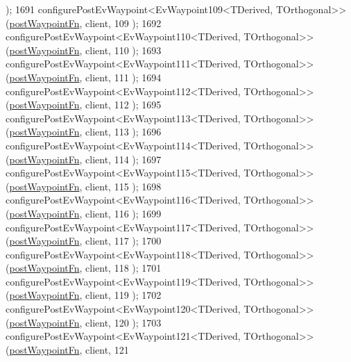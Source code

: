 \begin{DoxyCode}
      );
1691     configurePostEvWaypoint<EvWaypoint109<TDerived, TOrthogonal>>(\hyperlink{classcl__move__base__z_1_1WaypointEventDispatcher_a964a57fcce5d48ec60243230722d8dd7}{postWaypointFn}, client, 109
      );
1692     configurePostEvWaypoint<EvWaypoint110<TDerived, TOrthogonal>>(\hyperlink{classcl__move__base__z_1_1WaypointEventDispatcher_a964a57fcce5d48ec60243230722d8dd7}{postWaypointFn}, client, 110
      );
1693     configurePostEvWaypoint<EvWaypoint111<TDerived, TOrthogonal>>(\hyperlink{classcl__move__base__z_1_1WaypointEventDispatcher_a964a57fcce5d48ec60243230722d8dd7}{postWaypointFn}, client, 111
      );
1694     configurePostEvWaypoint<EvWaypoint112<TDerived, TOrthogonal>>(\hyperlink{classcl__move__base__z_1_1WaypointEventDispatcher_a964a57fcce5d48ec60243230722d8dd7}{postWaypointFn}, client, 112
      );
1695     configurePostEvWaypoint<EvWaypoint113<TDerived, TOrthogonal>>(\hyperlink{classcl__move__base__z_1_1WaypointEventDispatcher_a964a57fcce5d48ec60243230722d8dd7}{postWaypointFn}, client, 113
      );
1696     configurePostEvWaypoint<EvWaypoint114<TDerived, TOrthogonal>>(\hyperlink{classcl__move__base__z_1_1WaypointEventDispatcher_a964a57fcce5d48ec60243230722d8dd7}{postWaypointFn}, client, 114
      );
1697     configurePostEvWaypoint<EvWaypoint115<TDerived, TOrthogonal>>(\hyperlink{classcl__move__base__z_1_1WaypointEventDispatcher_a964a57fcce5d48ec60243230722d8dd7}{postWaypointFn}, client, 115
      );
1698     configurePostEvWaypoint<EvWaypoint116<TDerived, TOrthogonal>>(\hyperlink{classcl__move__base__z_1_1WaypointEventDispatcher_a964a57fcce5d48ec60243230722d8dd7}{postWaypointFn}, client, 116
      );
1699     configurePostEvWaypoint<EvWaypoint117<TDerived, TOrthogonal>>(\hyperlink{classcl__move__base__z_1_1WaypointEventDispatcher_a964a57fcce5d48ec60243230722d8dd7}{postWaypointFn}, client, 117
      );
1700     configurePostEvWaypoint<EvWaypoint118<TDerived, TOrthogonal>>(\hyperlink{classcl__move__base__z_1_1WaypointEventDispatcher_a964a57fcce5d48ec60243230722d8dd7}{postWaypointFn}, client, 118
      );
1701     configurePostEvWaypoint<EvWaypoint119<TDerived, TOrthogonal>>(\hyperlink{classcl__move__base__z_1_1WaypointEventDispatcher_a964a57fcce5d48ec60243230722d8dd7}{postWaypointFn}, client, 119
      );
1702     configurePostEvWaypoint<EvWaypoint120<TDerived, TOrthogonal>>(\hyperlink{classcl__move__base__z_1_1WaypointEventDispatcher_a964a57fcce5d48ec60243230722d8dd7}{postWaypointFn}, client, 120
      );
1703     configurePostEvWaypoint<EvWaypoint121<TDerived, TOrthogonal>>(\hyperlink{classcl__move__base__z_1_1WaypointEventDispatcher_a964a57fcce5d48ec60243230722d8dd7}{postWaypointFn}, client, 121

\end{DoxyCode}
